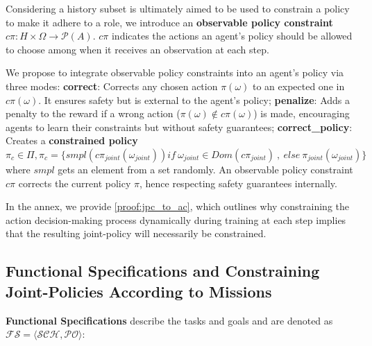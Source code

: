 \documentclass[runningheads]{llncs}
\theoremstyle{freethm}
\theoremstyle{proofoutline}
\newcounter{proof}
\begin{document}
Considering a history subset is ultimately aimed to be used to constrain a policy to make it adhere to a role, we introduce an \textbf{observable policy constraint} $c\pi: H \times \Omega \rightarrow \mathcal{P}(A)$. $c\pi$ indicates the actions an agent's policy should be allowed to choose among when it receives an observation at each step.

%     

We propose to integrate observable policy constraints into an agent's policy via three modes:
\textbf{correct}: Corrects any chosen action $\pi(\omega)$ to an expected one in $c\pi(\omega)$. It ensures safety but is external to the agent's policy; \quad
\textbf{penalize}: Adds a penalty to the reward if a wrong action ($\pi(\omega) \notin c\pi(\omega)$) is made, encouraging agents to learn their constraints but without safety guarantees; \quad
\textbf{correct\_policy}: Creates a \textbf{constrained policy} $\pi_c \in \Pi, \pi_c = \{smpl(c\pi_{joint}(\omega_{joint})) \allowbreak if \ \omega_{joint} \in Dom(c\pi_{joint}) \ \allowbreak, \ \allowbreak else \ \allowbreak \pi_{joint}(\omega_{joint})\}$ where $smpl$ gets an element from a set randomly. An observable policy constraint $c\pi$ corrects the current policy $\pi$, hence respecting safety guarantees internally.

In the annex, we provide \autoref{proof:jpc_to_ac}, which outlines why constraining the action decision-making process dynamically during training at each step implies that the resulting joint-policy will necessarily be constrained.


\subsection{Functional Specifications and Constraining Joint-Policies According to Missions}

\textbf{Functional Specifications} describe the tasks and goals and are denoted as $\mathcal{FS} = \langle \mathcal{SCH}, \mathcal{PO} \rangle$:
\end{document}
